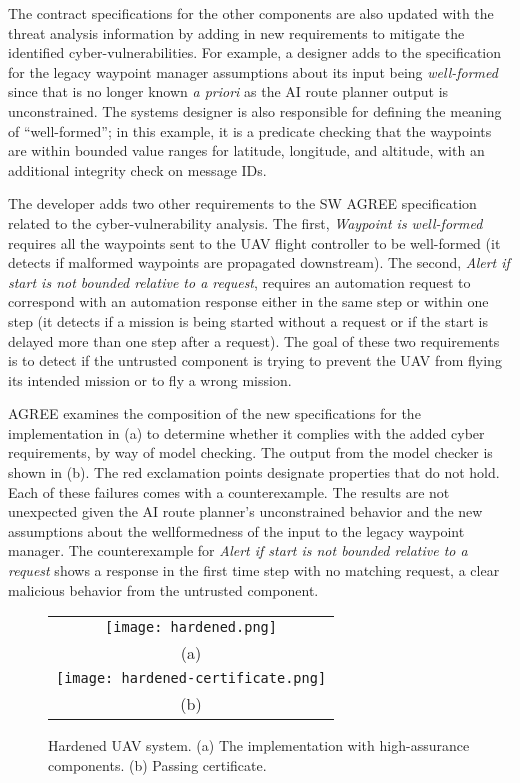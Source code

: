 The contract specifications for the other components are also updated with the threat analysis information by adding in new requirements to mitigate the identified cyber-vulnerabilities. For example, a designer adds to the specification for the legacy waypoint manager assumptions about its input being \emph{well-formed} since that is no longer known \emph{a priori} as the AI route planner output is unconstrained. The systems designer is also responsible for defining the meaning of ``well-formed''; in this example, it is a predicate checking that the waypoints are within bounded value ranges for latitude, longitude, and altitude, with an additional integrity check on message IDs.

The developer adds two other requirements to the SW AGREE specification related to the cyber-vulnerability analysis.  The first, \emph{Waypoint is well-formed} requires all the waypoints sent to the UAV flight controller to be well-formed (it detects if malformed waypoints are propagated downstream).  The second, \emph{Alert if start is not bounded relative to a request}, requires an automation request to correspond with an automation response either in the same step or within one step (it detects if a mission is being started without a request or if the start is delayed more than one step after a request). The goal of these two requirements is to detect if the untrusted component is trying to prevent the UAV from flying its intended mission or to fly a wrong mission. 

AGREE examines the composition of the new specifications for the implementation in (a) to determine whether it complies with the added cyber requirements, by way of model checking. The output from the model checker is shown in (b). The red exclamation points designate properties that do not hold. Each of these failures comes with a counterexample. The results are not unexpected given the AI route planner's unconstrained behavior and the new assumptions about the wellformedness of the input to the legacy waypoint manager. The counterexample for \emph{Alert if start is not bounded relative to a request} shows a response in the first time step with no matching request, a  clear malicious behavior from the untrusted component.

\begin{figure*}
  \begin{center}
    \begin{tabular}{c}
      \texttt{[image: hardened.png]} \\
      (a) \\
      \texttt{[image: hardened-certificate.png]} \\
      (b)
    \end{tabular}
  \end{center}
  \caption{Hardened UAV system. (a) The implementation with high-assurance components. (b) Passing certificate.}
  \label{fig:hardened}
\end{figure*}

